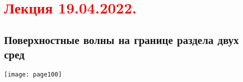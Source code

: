 \documentclass[main.tex]{subfiles}
\begin{document}
\section{\textcolor{red}{Лекция 19.04.2022.}}

\subsection{Поверхностные волны на границе раздела двух сред}
\texttt{[image: page100]}








\end{document}
